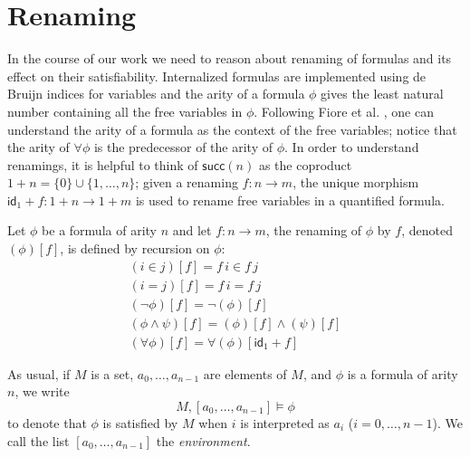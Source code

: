 \section{Renaming}
\label{sec:renaming}
\newcommand{\renaming}[2]{(#1)[#2]}
\newcommand{\inFm}[2]{#1 \in #2}
\newcommand{\eqFm}[2]{#1 = #2}
\newcommand{\negFm}[1]{\neg #1}
\newcommand{\andFm}[2]{#1 \wedge #2}
\newcommand{\forallFm}[1]{\forall #1}

\newcommand{\inIFm}[2]{\mathsf{Member}(#1,#2)}
\newcommand{\eqIFm}[2]{\mathsf{Equal}(#1,#2)}
\newcommand{\nandIFm}[2]{\mathsf{Nand}(#1,#2)}
\newcommand{\forallIFm}[1]{\mathsf{Forall(#1)}}


In the course of our work we need to reason about renaming of formulas
and its effect on their satisfiability. Internalized formulas are
implemented using de Bruijn indices for variables and the arity of a
formula $\phi$ gives the least natural number containing all the free
variables in $\phi$. Following Fiore et al. \cite{fiore-abssyn}, one
can understand the arity of a formula as the context of the free
variables; notice that the arity of $\forallFm{\phi}$ is the
predecessor of the arity of $\phi$. In order to understand renamings,
it is helpful to think of $\mathsf{succ}(n)$ as the coproduct
$1+n = \{0\} \cup \{1,\dots,n\}$; given a renaming $f \colon n \to m$,
the unique morphism $\mathsf{id}_1+f \colon 1+n \to 1+m$ is used to
rename free variables in a quantified formula.

\begin{definition}[Renaming]
  Let $\phi$ be a formula of arity $n$ and let $f \colon n \to m$, the
  renaming of $\phi$ by $f$, denoted $\renaming{\phi}{f}$, is defined
  by recursion on $\phi$:
  \begin{gather*}
    \renaming{\inFm{i}{j}}{f} = \inFm{f\,i}{f\,j}\\
    \renaming{\eqFm{i}{j}}{f} = \eqFm{f\,i}{f\,j}\\
    \renaming{\negFm{\phi}}{f} = \negFm{\renaming{\phi}{f}}\\
    \renaming{\andFm{\phi}{\psi}}{f} = \andFm{\renaming{\phi}{f}}{\renaming{\psi}{f}}\\
    \renaming{\forallFm{\phi}}{f} = \forallFm{\renaming{\phi}{\mathsf{id}_1+f}}
  \end{gather*}
\end{definition}

As usual, if $M$ is a set, $a_0,\dots,a_{n-1}$ are elements of $M$, and
$\phi$ is a formula of arity $n$, we write
\[
M,[a_0,\dots,a_{n-1}] \models \phi
\]
to denote that $\phi$ is satisfied by $M$ when $i$ is interpreted
as $a_i$ ($i=0,\dots,n-1$). We call the list $[a_0,\dots,a_{n-1}]$ the
\emph{environment}.

